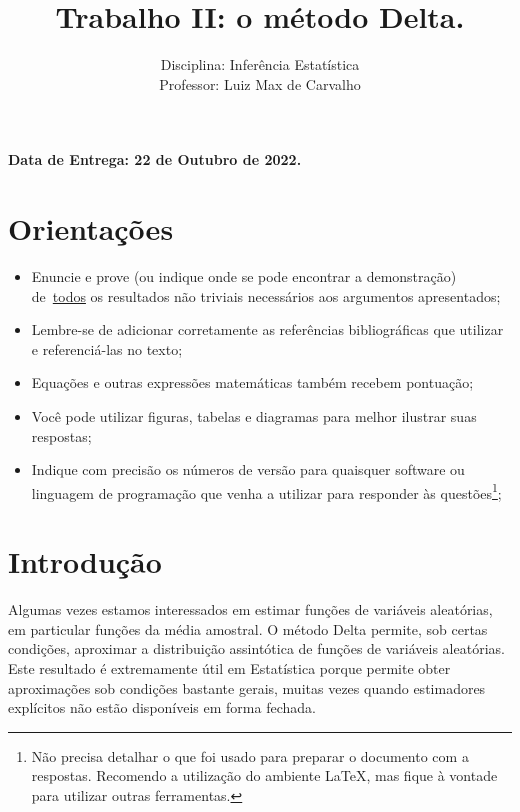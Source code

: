 \documentclass[a4paper,10pt, notitlepage]{report}
\title{Trabalho II: o método Delta.}
\author{Disciplina: Inferência Estatística \\ Professor: Luiz Max de Carvalho}
\begin{document}
\maketitle

\textbf{Data de Entrega: 22 de Outubro de 2022.}

\section*{Orientações}
\begin{itemize}
 \item Enuncie e prove (ou indique onde se pode encontrar a demonstração) de~\underline{todos} os resultados não triviais necessários aos argumentos apresentados;
 \item Lembre-se de adicionar corretamente as referências bibliográficas que utilizar e referenciá-las no texto;
 \item Equações e outras expressões matemáticas também recebem pontuação;
 \item Você pode utilizar figuras, tabelas e diagramas para melhor ilustrar suas respostas;
 \item Indique com precisão os números de versão para quaisquer software ou linguagem de programação que venha a utilizar para responder às questões\footnote{Não precisa detalhar o que foi usado para preparar o documento com a respostas. Recomendo a utilização do ambiente LaTeX, mas fique à vontade para utilizar outras ferramentas.};
 \end{itemize}


\section*{Introdução}

Algumas vezes estamos interessados em estimar funções de variáveis aleatórias, em particular funções da média amostral.
O método Delta permite, sob certas condições, aproximar a distribuição assintótica de funções de variáveis aleatórias.
Este resultado é extremamente útil em Estatística porque permite obter aproximações sob condições bastante gerais, muitas vezes quando estimadores explícitos não estão disponíveis em forma fechada.
\end{document}
